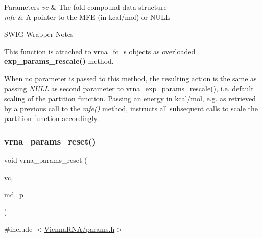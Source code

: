 \begin{DoxyParams}{Parameters}
{\em vc} & The fold compound data structure \\
\hline
{\em mfe} & A pointer to the M\+FE (in kcal/mol) or N\+U\+LL\\
\hline
\end{DoxyParams}
\begin{DoxyRefDesc}{S\+W\+I\+G Wrapper Notes}
\item[\hyperlink{wrappers__wrappers000051}{S\+W\+I\+G Wrapper Notes}]This function is attached to \hyperlink{group__fold__compound_structvrna__fc__s}{vrna\+\_\+fc\+\_\+s} objects as overloaded {\bfseries exp\+\_\+params\+\_\+rescale()} method.

When no parameter is passed to this method, the resulting action is the same as passing {\itshape N\+U\+LL} as second parameter to \hyperlink{group__energy__parameters_gad607bc3a5b5da16400e2ca4ea5560233}{vrna\+\_\+exp\+\_\+params\+\_\+rescale()}, i.\+e. default scaling of the partition function. Passing an energy in kcal/mol, e.\+g. as retrieved by a previous call to the {\itshape mfe()} method, instructs all subsequent calls to scale the partition function accordingly. \end{DoxyRefDesc}
\mbox{\label{group__energy__parameters_gac40dc82e48a72a97cfc58b9da08a7792}} 
\subsubsection{\texorpdfstring{vrna\+\_\+params\+\_\+reset()}{vrna\_params\_reset()}}
{\footnotesize\ttfamily void vrna\+\_\+params\+\_\+reset (\begin{DoxyParamCaption}\item[{\hyperlink{group__fold__compound_ga1b0cef17fd40466cef5968eaeeff6166}{vrna\+\_\+fold\+\_\+compound\+\_\+t} $\ast$}]{vc,  }\item[{\hyperlink{group__model__details_ga1f8a10e12a0a1915f2a4eff0b28ea17c}{vrna\+\_\+md\+\_\+t} $\ast$}]{md\+\_\+p }\end{DoxyParamCaption})}



{\ttfamily \#include $<$\hyperlink{params_8h}{Vienna\+R\+N\+A/params.\+h}$>$}



